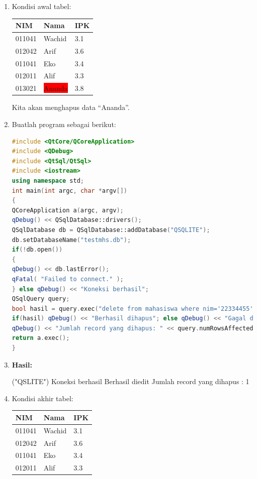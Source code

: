 \begin{enumerate}
\item Kondisi awal tabel:

\begin{tabular}{|l|l|l|}
\hline
NIM & Nama & IPK \\ \hline
011041 & Wachid & 3.1 \\ \hline
012042 & Arif & 3.6 \\ \hline
011041 & Eko & 3.4 \\ \hline
012011 & Alif & 3.3 \\ \hline
013021 & \colorbox{red}{Ananda} & 3.8 \\ \hline
\end{tabular}

Kita akan menghapus data ``Ananda''.

\item Buatlah program sebagai berikut:

\begin{lstlisting}[language=c++, caption= Menghapus data pada SQLite]
#include <QtCore/QCoreApplication>
#include <QDebug>
#include <QtSql/QtSql>
#include <iostream>
using namespace std;
int main(int argc, char *argv[])
{
QCoreApplication a(argc, argv);
qDebug() << QSqlDatabase::drivers();
QSqlDatabase db = QSqlDatabase::addDatabase("QSQLITE");
db.setDatabaseName("testmhs.db");
if(!db.open())
{
qDebug() << db.lastError();
qFatal( "Failed to connect." );
} else qDebug() << "Koneksi berhasil";
QSqlQuery query;
bool hasil = query.exec("delete from mahasiswa where nim='22334455'");
if(hasil) qDebug() << "Berhasil dihapus"; else qDebug() << "Gagal dihapus";
qDebug() << "Jumlah record yang dihapus: " << query.numRowsAffected();
return a.exec();
}
\end{lstlisting}

\item \textbf{Hasil:}

\begin{lcverbatim}
("QSLITE")
Koneksi berhasil
Berhasil diedit
Jumlah record yang dihapus : 1
\end{lcverbatim}

\item Kondisi akhir tabel:

\begin{tabular}{|l|l|l|}
\hline
NIM & Nama & IPK \\ \hline
011041 & Wachid & 3.1 \\ \hline
012042 & Arif & 3.6 \\ \hline
011041 & Eko & 3.4 \\ \hline
012011 & Alif & 3.3 \\ \hline

\end{tabular}

\end{enumerate}

